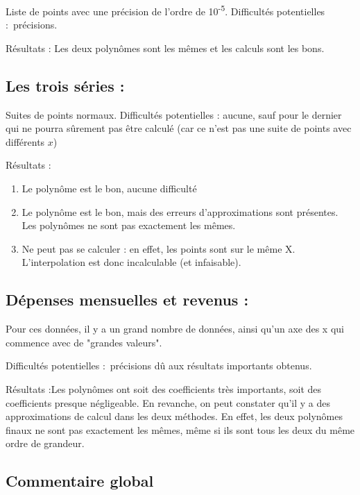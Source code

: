 \documentclass[letter]{article}
\begin{document}
Liste de points avec une précision de l'ordre de 10\textsuperscript{-5}.
Difficultés potentielles : précisions.



Résultats : Les deux polynômes sont les mêmes et les calculs sont les bons.



\subsection{Les trois séries :}
\label{sec:orgedfc694}

Suites de points normaux.
Difficultés potentielles : aucune, sauf pour le dernier qui ne pourra sûrement pas être calculé (car ce n'est pas une suite de points avec différents \(x\))


Résultats : 

\begin{enumerate}
\item Le polynôme est le bon, aucune difficulté

\item Le polynôme est le bon, mais des erreurs d'approximations sont présentes. Les polynômes ne sont pas exactement les mêmes.

\item Ne peut pas se calculer : en effet, les points sont sur le même X. L'interpolation est donc incalculable (et infaisable).
\end{enumerate}


\subsection{Dépenses mensuelles et revenus :}
\label{sec:orgcfad76a}

Pour ces données, il y a un grand nombre de données, ainsi qu'un axe des x qui commence avec de "grandes valeurs".

Difficultés potentielles : précisions dû aux résultats importants obtenus.


Résultats :Les polynômes ont soit des coefficients très importants, soit des coefficients presque négligeable. En revanche, on peut constater qu'il y a des approximations de calcul dans les deux méthodes. En effet, les deux polynômes finaux ne sont pas exactement les mêmes, même si ils sont tous les deux du même ordre de grandeur.


\subsection{Commentaire global}
\label{sec:orgc55b4ba}
\end{document}
